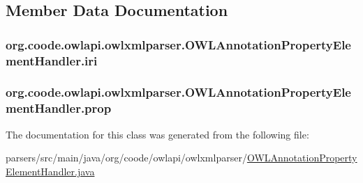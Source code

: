 \subsection{Member Data Documentation}
\hypertarget{classorg_1_1coode_1_1owlapi_1_1owlxmlparser_1_1_o_w_l_annotation_property_element_handler_af3e8b7831ee403c7426ca365a63102bd}{
\subsubsection[{iri}]{ org.\-coode.\-owlapi.\-owlxmlparser.\-O\-W\-L\-Annotation\-Property\-Element\-Handler.\-iri\hspace{0.3cm}{\ttfamily [private]}}}\label{classorg_1_1coode_1_1owlapi_1_1owlxmlparser_1_1_o_w_l_annotation_property_element_handler_af3e8b7831ee403c7426ca365a63102bd}
\hypertarget{classorg_1_1coode_1_1owlapi_1_1owlxmlparser_1_1_o_w_l_annotation_property_element_handler_a5531e390ad37511dd5f38d927c8ae417}{
\subsubsection[{prop}]{ org.\-coode.\-owlapi.\-owlxmlparser.\-O\-W\-L\-Annotation\-Property\-Element\-Handler.\-prop\hspace{0.3cm}{\ttfamily [private]}}}\label{classorg_1_1coode_1_1owlapi_1_1owlxmlparser_1_1_o_w_l_annotation_property_element_handler_a5531e390ad37511dd5f38d927c8ae417}


The documentation for this class was generated from the following file\-:\begin{DoxyCompactItemize}
\item 
parsers/src/main/java/org/coode/owlapi/owlxmlparser/\hyperlink{_o_w_l_annotation_property_element_handler_8java}{O\-W\-L\-Annotation\-Property\-Element\-Handler.\-java}\end{DoxyCompactItemize}
